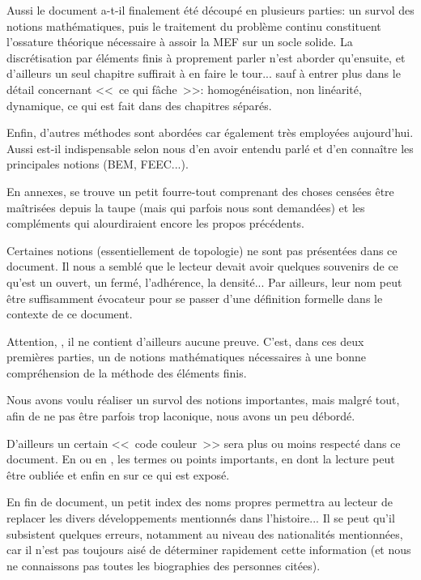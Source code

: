 \documentclass[11pt,pdflatex]{book}
\begin{document}
Aussi le document a-t-il finalement été découpé en plusieurs parties:
un survol des notions mathématiques, puis le traitement du problème
continu constituent l'ossature théorique nécessaire à assoir la MEF
sur un socle solide. La discrétisation par éléments finis à proprement parler
n'est aborder qu'ensuite, et d'ailleurs un seul chapitre suffirait à en faire
le tour... sauf à entrer plus dans le détail concernant <<~ce qui fâche~>>:
homogénéisation, non linéarité, dynamique, ce qui est fait dans des
chapitres séparés.

\medskip
Enfin, d'autres méthodes sont abordées car également très
employées aujourd'hui. Aussi est-il indispensable selon nous d'en avoir 
entendu parlé et d'en connaître les principales notions (BEM, FEEC...).

\medskip
En annexes, se trouve un petit fourre-tout comprenant des choses censées être 
maîtrisées depuis la taupe (mais qui parfois nous sont demandées) et les
compléments qui alourdiraient encore les propos précédents.

\medskip
Certaines notions (essentiellement de topologie) ne sont pas présentées dans ce 
document.
Il nous a semblé que le lecteur devait avoir quelques souvenirs de ce qu'est un
ouvert, un fermé, l'adhérence, la densité...
Par ailleurs, leur nom peut être suffisamment évocateur pour se passer d'une
définition formelle dans le contexte de ce document.

\bigskip
Attention, , il ne contient
d'ailleurs aucune preuve.
C'est, dans ces deux premières parties, un  de 
notions mathématiques nécessaires à une bonne compréhension de la méthode des éléments finis.

Nous avons voulu réaliser un survol des notions importantes, mais malgré tout, afin de ne
pas être parfois trop laconique, nous avons un peu débordé. \ifVersionDuDocEstVincent{}\fi

\medskip
\ifVersionDuDocEstVincent
D'ailleurs un certain <<~code couleur~>> sera plus ou moins respecté dans ce document.
En  ou en , les termes ou points importants,
en  dont la lecture peut être
oubliée et enfin en
 sur ce qui est exposé.
\fi

\medskip
En fin de document, un petit index des noms propres permettra au lecteur
de replacer les divers développements mentionnés dans l'histoire...
Il se peut qu'il subsistent quelques erreurs, notamment au niveau des
nationalités mentionnées, car il n'est pas toujours aisé de déterminer rapidement cette 
information (et nous ne connaissons pas toutes les biographies des personnes citées).
\end{document}
